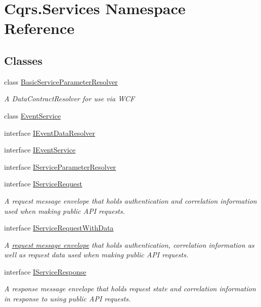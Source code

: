 \hypertarget{namespaceCqrs_1_1Services}{}\section{Cqrs.\+Services Namespace Reference}
\label{namespaceCqrs_1_1Services}
\subsection*{Classes}
\begin{DoxyCompactItemize}
\item 
class \hyperlink{classCqrs_1_1Services_1_1BasicServiceParameterResolver}{Basic\+Service\+Parameter\+Resolver}
\begin{DoxyCompactList}\small\item\em A Data\+Contract\+Resolver for use via W\+CF \end{DoxyCompactList}\item 
class \hyperlink{classCqrs_1_1Services_1_1EventService}{Event\+Service}
\item 
interface \hyperlink{interfaceCqrs_1_1Services_1_1IEventDataResolver}{I\+Event\+Data\+Resolver}
\item 
interface \hyperlink{interfaceCqrs_1_1Services_1_1IEventService}{I\+Event\+Service}
\item 
interface \hyperlink{interfaceCqrs_1_1Services_1_1IServiceParameterResolver}{I\+Service\+Parameter\+Resolver}
\item 
interface \hyperlink{interfaceCqrs_1_1Services_1_1IServiceRequest}{I\+Service\+Request}
\begin{DoxyCompactList}\small\item\em A request message envelope that holds authentication and correlation information used when making public A\+PI requests. \end{DoxyCompactList}\item 
interface \hyperlink{interfaceCqrs_1_1Services_1_1IServiceRequestWithData}{I\+Service\+Request\+With\+Data}
\begin{DoxyCompactList}\small\item\em A \hyperlink{}{request message envelope} that holds authentication, correlation information as well as request data used when making public A\+PI requests. \end{DoxyCompactList}\item 
interface \hyperlink{interfaceCqrs_1_1Services_1_1IServiceResponse}{I\+Service\+Response}
\begin{DoxyCompactList}\small\item\em A response message envelope that holds request state and correlation information in response to using public A\+PI requests. \end{DoxyCompactList}\item 

\end{DoxyCompactItemize}
